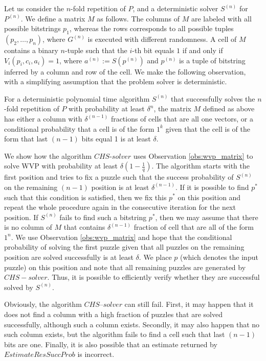 Let us consider the $n$-fold repetition of $P$, and a deterministic solver $S^{(n)}$ for $P^{(n)}$.
We define a matrix $M$ as follows.
The columns of $M$ are labeled with all possible bitstrings $p_1$,
whereas the rows corresponds to all possible tuples $(p_2, \dotsc, p_n)$, where $G^{(n)}$ is executed with different randomness.
A cell of $M$ contains a binary $n$-tuple such that the $i$-th bit equals $1$ if and only if $V_i(p_i, c_i, a_i) = 1$, where
 $a^{(n)} := S(p^{(n)})$ and $p^{(n)}$ is a tuple of bitstring inferred by a column and row of the cell.
We make the following observation, with a simplifying assumption that the problem solver is deterministic.
\begin{observation}
\label{obs:wvp_matrix}
For a deterministic polynomial time algorithm $S^{(n)}$ that successfully solves the $n$-fold repetition of $P$ with probability at least $\delta^{n}$,
the matrix $M$ defined as above has either a column with $\delta^{(n-1)}$ fractions of cells that are all one vectors, or
a conditional probability that a cell is of the form $1^k$ given that the cell is of the form that last $(n-1)$ bits equal 1 is at least $\delta$.
\end{observation}
%
%
We show how the algorithm $\mathit{CHS\text{-}solver}$ uses Observation \ref{obs:wvp_matrix} to solve WVP with probability at least $\delta(1 - \frac{1}{q})$.
The algorithm starts with the first position and tries to fix a puzzle such that the success probability of $S^{(n)}$ on the remaining $(n-1)$
position is at least $\delta^{(n-1)}$. If it is possible to find $p^*$ such that this condition is satisfied, then we fix this $p^*$
on this position and repeat the whole procedure again in the consecutive iteration for the next position.
If $S^{(n)}$ fails to find such a bitstring $p^*$, then we may assume that there is no column of $M$ that contains $\delta^{(n-1)}$ fraction
of cell that are all of the form $1^n$. We use Observation \ref{obs:wvp_matrix} and hope that the conditional probability of
solving the first puzzle given that all puzzles on the remaining position are solved successfully is at least $\delta$.
We place $p$ (which denotes the input puzzle) on this position and note that all remaining puzzles are generated by $CHS-solver$.
Thus, it is possible to efficiently verify whether they are successful solved by $S^{(n)}$.

Obviously, the algorithm $\mathit{CHS\text{--}solver}$ can still fail. First, it may happen that it does not find a column
with a high fraction of puzzles that are solved successfully, although such a column exists.
Secondly, it may also happen that no such column exists, but the algorithm fails to find a cell such that last $(n-1)$ bits are one.
Finally, it is also possible that an estimate returned by $\mathit{EstimateResSuccProb}$ is incorrect.

